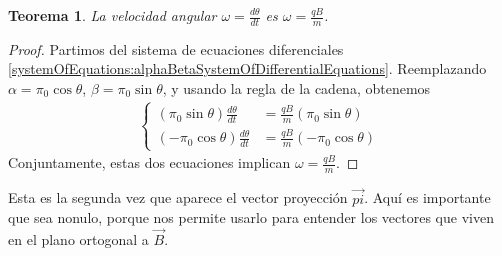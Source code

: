 \documentclass{article}
\newtheorem{theorem}{Teorema}
\begin{document}
  \begin{theorem}
    \label{theorem:thetaDifferentialEquation}
    La velocidad angular \(\omega = \frac{d \theta}{d t}\) es \(\omega = \frac{q B}{m}\).
  \end{theorem}
  \begin{proof}
    Partimos del sistema de ecuaciones diferenciales \eqref{systemOfEquations:alphaBetaSystemOfDifferentialEquations}.
    Reemplazando \(\alpha = \pi_0 \cos \theta\), \(\beta = \pi_0 \sin \theta\), y usando la regla de la cadena, obtenemos
    \begin{align}
      \left\{
        \begin{aligned}
          (\pi_0 \sin \theta) \frac{d \theta}{d t}
          &=
          \frac{q B}{m} (\pi_0 \sin \theta)
          \\
          (- \pi_0 \cos \theta) \frac{d \theta}{d t}
          &=
          \frac{q B}{m} (- \pi_0 \cos \theta)
        \end{aligned}
      \right.
    \end{align}
    Conjuntamente, estas dos ecuaciones implican \(\omega = \frac{q B}{m}\).
  \end{proof}

  Esta es la segunda vez que aparece el vector proyección \(\vec{pi}\).
  Aquí es importante que sea nonulo, porque nos permite usarlo para entender los vectores que viven en el plano ortogonal a \(\vec{B}\).
\end{document}
